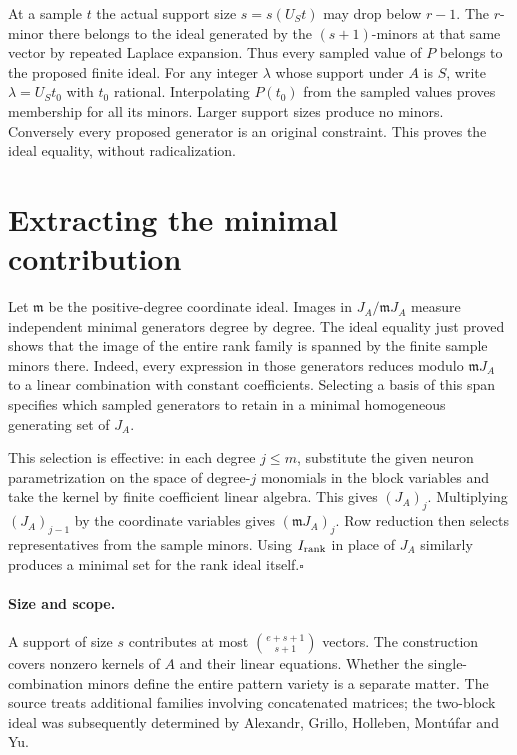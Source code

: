 \documentclass[11pt]{article}
\begin{document}
At a sample $t$ the actual support size $s=s(U_S t)$ may drop below $r-1$. The $r$-minor there belongs to the ideal generated by the $(s+1)$-minors at that same vector by repeated Laplace expansion. Thus every sampled value of $P$ belongs to the proposed finite ideal. For any integer $\lambda$ whose support under $A$ is $S$, write $\lambda=U_S t_0$ with $t_0$ rational. Interpolating $P(t_0)$ from the sampled values proves membership for all its minors. Larger support sizes produce no minors. Conversely every proposed generator is an original constraint. This proves the ideal equality, without radicalization.

\section*{Extracting the minimal contribution}
Let $\mathfrak m$ be the positive-degree coordinate ideal. Images in $J_A/\mathfrak m J_A$ measure independent minimal generators degree by degree. The ideal equality just proved shows that the image of the entire rank family is spanned by the finite sample minors there. Indeed, every expression in those generators reduces modulo $\mathfrak m J_A$ to a linear combination with constant coefficients. Selecting a basis of this span specifies which sampled generators to retain in a minimal homogeneous generating set of $J_A$.

This selection is effective: in each degree $j\le m$, substitute the given neuron parametrization on the space of degree-$j$ monomials in the block variables and take the kernel by finite coefficient linear algebra. This gives $(J_A)_j$. Multiplying $(J_A)_{j-1}$ by the coordinate variables gives $(\mathfrak m J_A)_j$. Row reduction then selects representatives from the sample minors. Using $I_{\rm rank}$ in place of $J_A$ similarly produces a minimal set for the rank ideal itself.\hfill$\square$

\paragraph{Size and scope.} A support of size $s$ contributes at most $\binom{e+s+1}{s+1}$ vectors. The construction covers nonzero kernels of $A$ and their linear equations. Whether the single-combination minors define the entire pattern variety is a separate matter. The source treats additional families involving concatenated matrices; the two-block ideal was subsequently determined by Alexandr, Grillo, Holleben, Mont\'ufar and Yu.
\end{document}
